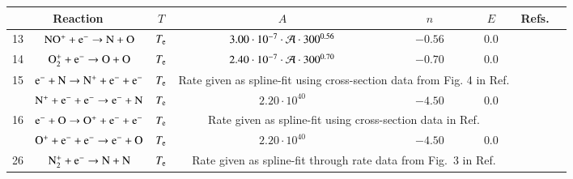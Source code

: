 \documentclass{warpdoc}
\renewcommand{\fontsizetable}{\footnotesize\scalefont{0.9}}
\begin{document}
\begin{table}[t]
\fontsizetable
\begin{center}
\begin{threeparttable}
\begin{tabular}{cccccccc} 
\toprule

\multicolumn{2}{c}{Reaction} & $T$ & $A$ & $n$ & $E$ & \multicolumn{1}{c}{Refs.}\\ 
\midrule                




                          
13 & $\rm NO^{+} + e^- \rightarrow  N + O $  &$T_{\rm e}$ & $3.00 \cdot 10^{-7} \cdot {\cal A} \cdot300^{0.56}$ & $-0.56$ & $0.0$ & \cite{jgr:2004:sheehan} \\
                                          
14 & $\rm  O_2^{+}+e^- \rightarrow  O + O $ &$T_{\rm e}$ & $2.40 \cdot 10^{-7} \cdot {\cal A}\cdot300^{0.70} $ & $-0.70$ & $0.0$ & \cite{aip:2001:peverall} \\
\midrule
15 & $\rm e^- + N \rightarrow N^{+}+e^- + e^-$ &$T_{\rm e}$ & \multicolumn{3}{p{8cm}}{Rate given as spline-fit using cross-section data from Fig. 4 in Ref. \cite{pr:1962:smith}} 
                                               &\cite{pr:1962:smith}\\
~ & $\rm N^{+}+e^- + e^-\rightarrow e^- + N $ &$T_{\rm e}$ & $2.20 \cdot 10^{40} $ & $-4.50$ & $0.0$ 
                                               &\cite{nasa:1973:dunn}\\
   \midrule                                       
16 & $\rm e^- + O \rightarrow O^{+}+e^- + e^-$ &$T_{\rm e}$ & \multicolumn{3}{p{8cm}}{Rate given as spline-fit using cross-section data in Ref. \cite{pcpp:1992:morgan}} 
                                               &\cite{pcpp:1992:morgan}\\
~ & $\rm O^{+}+e^- + e^-\rightarrow e^- + O $ &$T_{\rm e}$ & $2.20 \cdot 10^{40} $ & $-4.50$ & $0.0$ 
                                               &\cite{nasa:1973:dunn}\\
  \midrule                                        
26 & $\rm N_2^{+}+e^-\rightarrow N + N $  &$T_{\rm e}$ &  \multicolumn{3}{p{8cm}}{Rate given as spline-fit through rate data from Fig.~3 in Ref. \cite{aip:1998:peterson}} & \cite{aip:1998:peterson} \\
                                          

\end{tabular}
\end{threeparttable}
\end{center}
\end{table}
\end{document}
